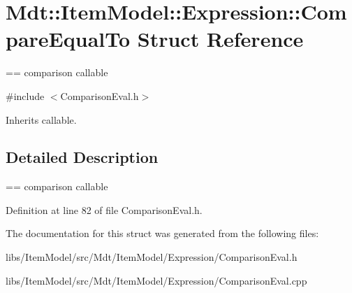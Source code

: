 \hypertarget{struct_mdt_1_1_item_model_1_1_expression_1_1_compare_equal_to}{}\section{Mdt\+:\+:Item\+Model\+:\+:Expression\+:\+:Compare\+Equal\+To Struct Reference}
\label{struct_mdt_1_1_item_model_1_1_expression_1_1_compare_equal_to}


== comparison callable  




{\ttfamily \#include $<$Comparison\+Eval.\+h$>$}



Inherits callable.



\subsection{Detailed Description}
== comparison callable 

Definition at line 82 of file Comparison\+Eval.\+h.



The documentation for this struct was generated from the following files\+:\begin{DoxyCompactItemize}
\item 
libs/\+Item\+Model/src/\+Mdt/\+Item\+Model/\+Expression/Comparison\+Eval.\+h\item 
libs/\+Item\+Model/src/\+Mdt/\+Item\+Model/\+Expression/Comparison\+Eval.\+cpp\end{DoxyCompactItemize}
